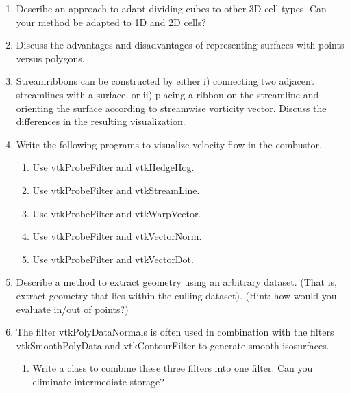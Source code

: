 \begin{enumerate}

\item Describe an approach to adapt dividing cubes to other 3D cell types. Can your method be adapted to 1D and 2D cells?

\item Discuss the advantages and disadvantages of representing surfaces with points versus polygons.

\item Streamribbons can be constructed by either i) connecting two adjacent streamlines with a surface, or ii) placing a ribbon on the streamline and orienting the surface according to streamwise vorticity vector. Discuss the differences in the resulting visualization.

\item Write the following programs to visualize velocity flow in the combustor.

    \begin{enumerate}

    \item Use vtkProbeFilter and vtkHedgeHog.

    \item Use vtkProbeFilter and vtkStreamLine.

    \item Use vtkProbeFilter and vtkWarpVector.

    \item Use vtkProbeFilter and vtkVectorNorm.

    \item Use vtkProbeFilter and vtkVectorDot.

    \end{enumerate}

\item Describe a method to extract geometry using an arbitrary dataset. (That is, extract geometry that lies within the culling dataset). (Hint: how would you evaluate in/out of points?)

\item The filter vtkPolyDataNormals is often used in combination with the filters vtkSmoothPolyData and vtkContourFilter to generate smooth isosurfaces.

    \begin{enumerate}

    \item Write a class to combine these three filters into one filter. Can you eliminate intermediate storage?


\end{enumerate}
\end{enumerate}
